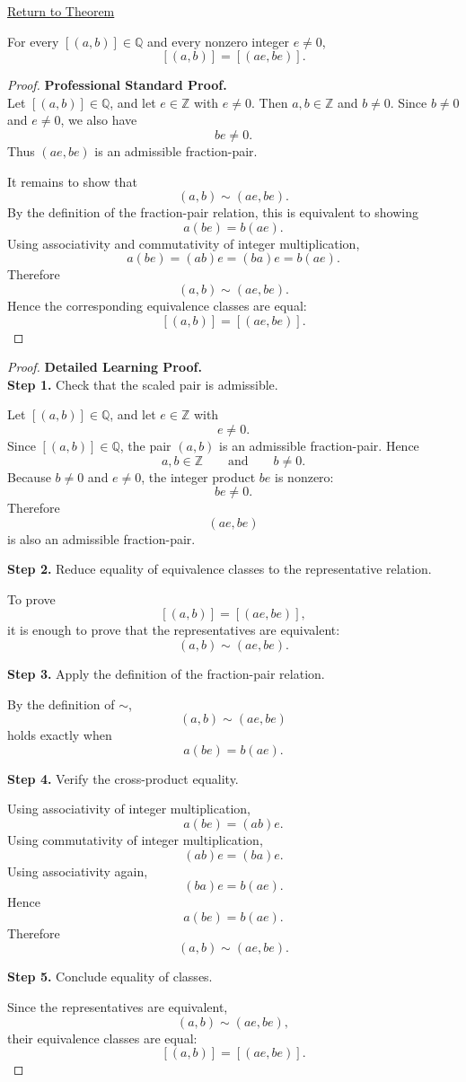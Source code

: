 \newpage
{}
\label{prf:ec-scaling}

\begin{remark*}[Return]
\hyperref[thm:ec-scaling]{Return to Theorem}
\end{remark*}

\begin{theorem*}
For every $[(a,b)]\in\mathbb{Q}$ and every nonzero integer $e\neq 0$,
\[
[(a,b)] = [(ae,be)].
\]
\end{theorem*}

\begin{proof}
\textbf{Professional Standard Proof.}~\\
Let $[(a,b)]\in\mathbb{Q}$, and let $e\in\mathbb{Z}$ with $e\neq 0$.
Then $a,b\in\mathbb{Z}$ and $b\neq 0$. Since $b\neq 0$ and $e\neq 0$,
we also have
\[
be\neq 0.
\]
Thus $(ae,be)$ is an admissible fraction-pair.

It remains to show that
\[
(a,b)\sim(ae,be).
\]
By the definition of the fraction-pair relation, this is equivalent to showing
\[
a(be)=b(ae).
\]
Using associativity and commutativity of integer multiplication,
\[
a(be)=(ab)e=(ba)e=b(ae).
\]
Therefore
\[
(a,b)\sim(ae,be).
\]
Hence the corresponding equivalence classes are equal:
\[
[(a,b)] = [(ae,be)].
\]
\end{proof}

\begin{proof}
\textbf{Detailed Learning Proof.}~\\

\textbf{Step 1.} Check that the scaled pair is admissible.

Let $[(a,b)]\in\mathbb{Q}$, and let $e\in\mathbb{Z}$ with
\[
e\neq 0.
\]
Since $[(a,b)]\in\mathbb{Q}$, the pair $(a,b)$ is an admissible
fraction-pair. Hence
\[
a,b\in\mathbb{Z}
\qquad\text{and}\qquad
b\neq 0.
\]
Because $b\neq 0$ and $e\neq 0$, the integer product $be$ is nonzero:
\[
be\neq 0.
\]
Therefore
\[
(ae,be)
\]
is also an admissible fraction-pair.

\textbf{Step 2.} Reduce equality of equivalence classes to the representative relation.

To prove
\[
[(a,b)] = [(ae,be)],
\]
it is enough to prove that the representatives are equivalent:
\[
(a,b)\sim(ae,be).
\]

\textbf{Step 3.} Apply the definition of the fraction-pair relation.

By the definition of $\sim$,
\[
(a,b)\sim(ae,be)
\]
holds exactly when
\[
a(be)=b(ae).
\]

\textbf{Step 4.} Verify the cross-product equality.

Using associativity of integer multiplication,
\[
a(be)=(ab)e.
\]
Using commutativity of integer multiplication,
\[
(ab)e=(ba)e.
\]
Using associativity again,
\[
(ba)e=b(ae).
\]
Hence
\[
a(be)=b(ae).
\]
Therefore
\[
(a,b)\sim(ae,be).
\]

\textbf{Step 5.} Conclude equality of classes.

Since the representatives are equivalent,
\[
(a,b)\sim(ae,be),
\]
their equivalence classes are equal:
\[
[(a,b)] = [(ae,be)].
\]
\end{proof}

